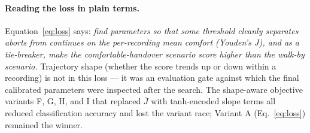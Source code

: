 \documentclass[11pt]{article}
\begin{document}
\paragraph{Reading the loss in plain terms.}
Equation~\eqref{eq:loss} says: \emph{find parameters so that some threshold
cleanly separates aborts from continues on the per-recording mean comfort
(Youden's $J$), and as a tie-breaker, make the comfortable-handover
scenario score higher than the walk-by scenario.} Trajectory shape (whether
the score trends up or down within a recording) is not in this loss --- it
was an evaluation gate against which the final calibrated parameters were
inspected after the search. The shape-aware objective variants F, G, H, and
I that replaced $\overline{J}$ with tanh-encoded slope terms all reduced
classification accuracy and lost the variant race; Variant A
(Eq.~\ref{eq:loss}) remained the winner.
\end{document}
